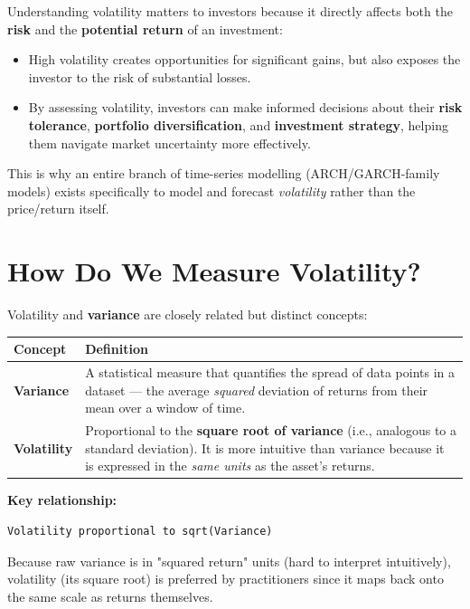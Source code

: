 \documentclass[12pt,openany]{book}
\theoremstyle{definition}
\theoremstyle{remark}
\begin{document}
Understanding volatility matters to investors because it directly affects both the \textbf{risk} and the \textbf{potential return} of an investment:

\begin{itemize}
\item High volatility creates opportunities for significant gains, but also exposes the investor to the risk of substantial losses.
\item By assessing volatility, investors can make informed decisions about their \textbf{risk tolerance}, \textbf{portfolio diversification}, and \textbf{investment strategy}, helping them navigate market uncertainty more effectively.
\end{itemize}

This is why an entire branch of time-series modelling (ARCH/GARCH-family models) exists specifically to model and forecast \emph{volatility} rather than the price/return itself.


\section{How Do We Measure Volatility?}

Volatility and \textbf{variance} are closely related but distinct concepts:

{\small
\begin{longtable}{@{}L{0.28\textwidth}L{0.64\textwidth}@{}}
\toprule
\textbf{Concept} & \textbf{Definition} \\
\midrule
\textbf{Variance} & A statistical measure that quantifies the spread of data points in a dataset — the average \emph{squared} deviation of returns from their mean over a window of time. \\
\textbf{Volatility} & Proportional to the \textbf{square root of variance} (i.e., analogous to a standard deviation). It is more intuitive than variance because it is expressed in the \emph{same units} as the asset's returns. \\
\bottomrule
\end{longtable}
}

\textbf{Key relationship:}

\begin{lstlisting}[style=notesCode]
Volatility proportional to sqrt(Variance)
\end{lstlisting}

Because raw variance is in "squared return" units (hard to interpret intuitively), volatility (its square root) is preferred by practitioners since it maps back onto the same scale as returns themselves.
\end{document}
